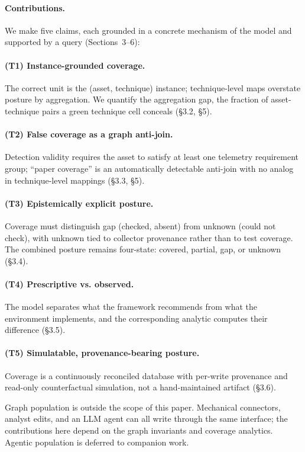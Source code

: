 \documentclass[10pt]{article}
\begin{document}
\paragraph{Contributions.} We make five claims, each grounded in a concrete mechanism of the model and supported by a query (Sections~3--6):

\paragraph{(T1) Instance-grounded coverage.} The correct unit is the (asset, technique) instance; technique-level maps overstate posture by aggregation. We quantify the aggregation gap, the fraction of asset-technique pairs a green technique cell conceals (\S3.2, \S5).

\paragraph{(T2) False coverage as a graph anti-join.} Detection validity requires the asset to satisfy at least one telemetry requirement group; ``paper coverage'' is an automatically detectable anti-join with no analog in technique-level mappings (\S3.3, \S5).

\paragraph{(T3) Epistemically explicit posture.} Coverage must distinguish gap (checked, absent) from unknown (could not check), with unknown tied to collector provenance rather than to test coverage. The combined posture remains four-state: covered, partial, gap, or unknown (\S3.4).

\paragraph{(T4) Prescriptive vs. observed.} The model separates what the framework recommends from what the environment implements, and the corresponding analytic computes their difference (\S3.5).

\paragraph{(T5) Simulatable, provenance-bearing posture.} Coverage is a continuously reconciled database with per-write provenance and read-only counterfactual simulation, not a hand-maintained artifact (\S3.6).

Graph population is outside the scope of this paper. Mechanical connectors, analyst edits, and an LLM agent can all write through the same interface; the contributions here depend on the graph invariants and coverage analytics. Agentic population is deferred to companion work.
\end{document}

